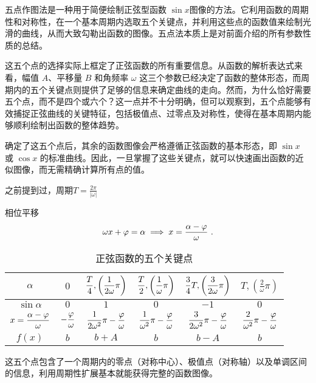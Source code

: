 五点作图法是一种用于简便绘制正弦型函数 $\sin x$图像的方法。它利用函数的周期性和对称性，在一个基本周期内选取五个关键点，并利用这些点的函数值来绘制光滑的曲线，从而大致勾勒出函数的图像。五点法本质上是对前面介绍的所有参数性质的总结。



这五个点的选择实际上框定了正弦函数的所有重要信息。从函数的解析表达式来看，幅值 $A$、平移量 $B$ 和角频率 $\omega$ 这三个参数已经决定了函数的整体形态，而周期内的五个关键点则提供了足够的信息来确定曲线的走向。然而，为什么恰好需要五个点，而不是四个或六个？这一点并不十分明确，但可以观察到，五个点能够有效捕捉正弦曲线的关键特征，包括极值点、过零点及对称性，使得在基本周期内能够顺利绘制出函数的整体趋势。

确定了这五个点后，其余的函数图像会严格遵循正弦函数的基本形态，即 $\sin x$ 或 $\cos x$ 的标准曲线。因此，一旦掌握了这些关键点，就可以快速画出函数的近似图像，而无需精确计算所有点的值。




之前提到过，周期$\displaystyle T = \frac{2\pi}{|\omega|}$

相位平移
\begin{equation}
\omega x + \varphi=\alpha\implies x={\alpha-\varphi\over \omega}~.
\end{equation}

\begin{table}[ht]
\centering
\caption{正弦函数的五个关键点}\label{tab_HsSinF1}
\begin{tabular}{|c|c|c|c|c|c|}
\hline
$\alpha$ & $0$ &$\displaystyle {T\over4},\left(\frac{1}{2\omega}\pi\right)$& $\displaystyle {T\over2},\left(\frac{1}{\omega}\pi\right)$ & $\displaystyle {3\over4}T,\left(\frac{3}{2\omega}\pi\right)$ & $\displaystyle T,\left(\frac{2}{\omega}\pi\right)$\\
\hline
$\sin \alpha$ & $0$&$1$&$0$&$-1$&$0$ \\
\hline
$x=\displaystyle{\alpha-\varphi\over \omega}$&$\displaystyle-{\varphi\over \omega}$&$\displaystyle{1\over 2\omega^2}\pi-{\varphi\over \omega}$&$\displaystyle{1\over \omega^2}\pi-{\varphi\over \omega}$&$\displaystyle{3\over 2\omega^2}\pi-{\varphi\over \omega}$&$\displaystyle{2\over \omega^2}\pi-{\varphi\over \omega}$\\
\hline
$f(x)$ & $b$&$b+A$&$b$&$b-A$&$b$ \\
\hline
\end{tabular}
\end{table}
这五个点包含了一个周期内的零点（对称中心）、极值点（对称轴）以及单调区间的信息，利用周期性扩展基本就能获得完整的函数图像。


